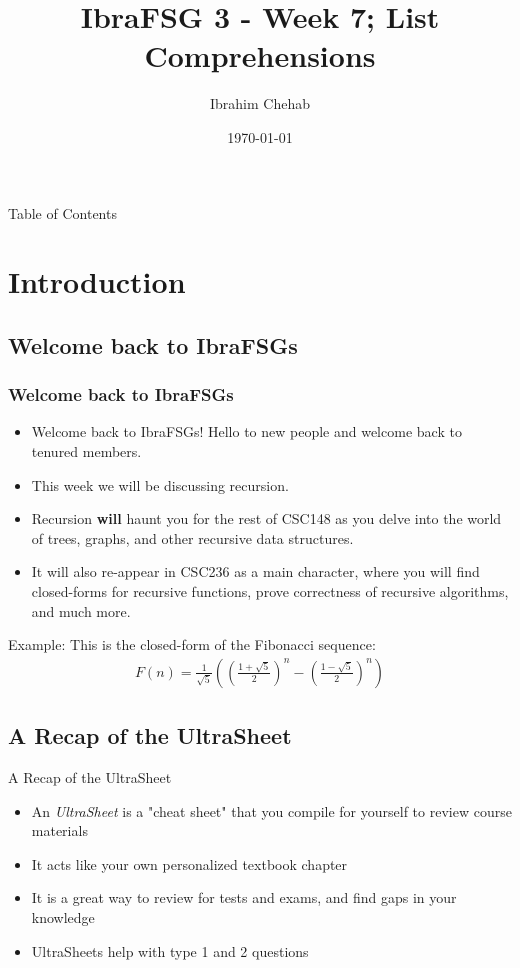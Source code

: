\documentclass[hyperref={colorlinks,citecolor=blue,linkcolor=blue,urlcolor=blue}]{beamer}
\title[IbraFSG 3: List Comprehensions]{IbraFSG\texttrademark{} 3 - Week 7; List Comprehensions}
\author{Ibrahim Chehab}
\institute{UTM RGASC}
\date{\today}
\begin{document}
\begin{frame}
  \titlepage
\end{frame}

\begin{frame}{Table of Contents}
  \tableofcontents
\end{frame}

\section{Introduction}

\subsection{Welcome back to IbraFSGs\texttrademark{}}
\begin{frame}
  \frametitle{Welcome back to IbraFSGs\texttrademark{}}
  \begin{itemize}
  \item Welcome back to IbraFSGs\texttrademark{}! Hello to new people and welcome back to tenured members.
  \item This week we will be discussing recursion.
  \item Recursion \textbf<overlay specification>{will} haunt you for the rest of CSC148 as you delve into the world of trees, graphs, and other recursive data structures. 
 \item It will also re-appear in CSC236 as a main character, where you will find closed-forms for recursive functions, prove correctness of recursive algorithms, and much more.
\end{itemize}

Example: This is the closed-form of the Fibonacci sequence:
\begin{align}
F(n) = \frac{1}{\sqrt{5}}\left(\left(\frac{1+\sqrt{5}}{2}\right)^n - \left(\frac{1-\sqrt{5}}{2}\right)^n\right)
\end{align}

\end{frame}

\subsection{A Recap of the UltraSheet\texttrademark{}}
\begin{frame}{A Recap of the UltraSheet\texttrademark{}}
  \begin{itemize}
    \item An \textit<overlay specification>{UltraSheet\texttrademark{}} is a "cheat sheet" that you compile for yourself to review course materials 
    \item It acts like your own personalized textbook chapter
    \item It is a great way to review for tests and exams, and find gaps in your knowledge
    \item UltraSheets\texttrademark{} help with type 1 and 2 questions 
  \end{itemize}


\end{frame}
\end{document}
